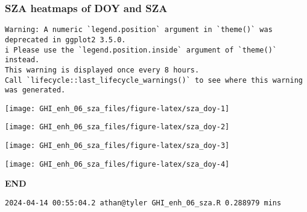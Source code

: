 \documentclass[
  10pt,
  a4paper,oneside]{article}
\begin{document}
\newpage
\FloatBarrier

\hypertarget{sza-heatmaps-of-doy-and-sza}{%
\subsubsection{SZA heatmaps of DOY and SZA}\label{sza-heatmaps-of-doy-and-sza}}

\begin{verbatim}
Warning: A numeric `legend.position` argument in `theme()` was deprecated in ggplot2 3.5.0.
i Please use the `legend.position.inside` argument of `theme()` instead.
This warning is displayed once every 8 hours.
Call `lifecycle::last_lifecycle_warnings()` to see where this warning was generated.
\end{verbatim}

\begin{center}\texttt{[image: GHI\_enh\_06\_sza\_files/figure-latex/sza\_doy-1]} \end{center}

\begin{center}\texttt{[image: GHI\_enh\_06\_sza\_files/figure-latex/sza\_doy-2]} \end{center}

\begin{center}\texttt{[image: GHI\_enh\_06\_sza\_files/figure-latex/sza\_doy-3]} \end{center}

\begin{center}\texttt{[image: GHI\_enh\_06\_sza\_files/figure-latex/sza\_doy-4]} \end{center}

\textbf{END}

\begin{verbatim}
2024-04-14 00:55:04.2 athan@tyler GHI_enh_06_sza.R 0.288979 mins
\end{verbatim}
\end{document}
